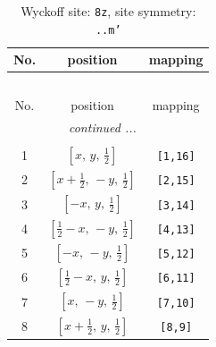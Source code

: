\documentclass[fleqn,8pt]{jsarticle}
\begin{document}
\begin{longtable}{ccc}
\caption{Wyckoff site: {\tt 8z}, site symmetry: {\tt ..m'}}
 \\
 \hline \hline
No. & position & mapping \\ \hline \endfirsthead

\multicolumn{2}{l}{\tablename\ \thetable{}} \\
 \hline \hline
No. & position & mapping \\ \hline \endhead

 \hline \hline
\multicolumn{2}{r}{\footnotesize\it continued ...} \\ \endfoot

 \hline \hline
\multicolumn{2}{r}{} \\ \endlastfoot

1 & $\left[ x,\, y,\, \frac{1}{2} \right]$ & {\tt [1,16]} \\ \hline
2 & $\left[ x + \frac{1}{2},\, - y,\, \frac{1}{2} \right]$ & {\tt [2,15]} \\ \hline
3 & $\left[ - x,\, y,\, \frac{1}{2} \right]$ & {\tt [3,14]} \\ \hline
4 & $\left[ \frac{1}{2} - x,\, - y,\, \frac{1}{2} \right]$ & {\tt [4,13]} \\ \hline
5 & $\left[ - x,\, - y,\, \frac{1}{2} \right]$ & {\tt [5,12]} \\ \hline
6 & $\left[ \frac{1}{2} - x,\, y,\, \frac{1}{2} \right]$ & {\tt [6,11]} \\ \hline
7 & $\left[ x,\, - y,\, \frac{1}{2} \right]$ & {\tt [7,10]} \\ \hline
8 & $\left[ x + \frac{1}{2},\, y,\, \frac{1}{2} \right]$ & {\tt [8,9]} \\
\end{longtable}
\renewcommand{\arraystretch}{1.2}
\end{document}
